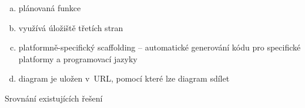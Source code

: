 \begin{table}
  \footnotesize
  \begin{enumerate}[a.,ref=\alph*,noitemsep]
    \item plánovaná funkce \label{tab:ec:plan}
    \item využívá úložiště třetích stran \label{tab:ec:external-storage}
    \item platformně-specifický scaffolding -- automatické generování kódu pro specifické platformy a programovací jazyky \label{tab:scaffolding}
    \item diagram je uložen v~URL, pomocí které lze diagram sdílet \label{tab:ec:urlsharing}
  \end{enumerate}
  
  \caption{Srovnání existujících řešení}
  \label{tab:existing-comparison}
\end{table}
